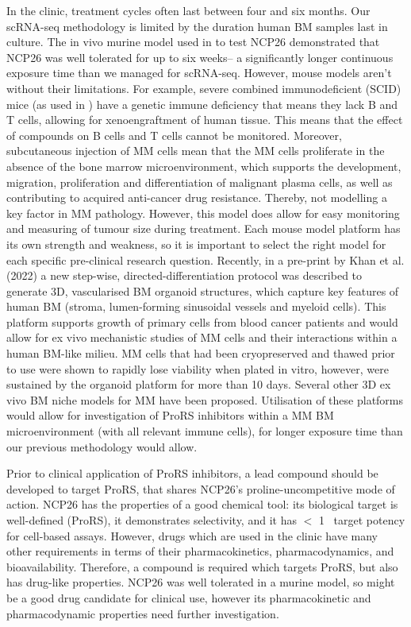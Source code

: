 In the clinic, treatment cycles often last between four and six months.
Our scRNA-seq methodology is limited by the duration human BM samples last in culture.
The in vivo murine model used in \cite{bottpreclinical2022} to test NCP26 demonstrated that NCP26 was well tolerated for up to six weeks-- a significantly longer continuous exposure time than we managed for scRNA-seq.
However, mouse models aren't without their limitations.
For example, severe combined immunodeficient (SCID) mice (as used in \cite{bottpreclinical2022}) have a genetic immune deficiency that means they lack B and T cells, allowing for xenoengraftment of human tissue.
This means that the effect of compounds on B cells and T cells cannot be monitored.
Moreover, subcutaneous injection of MM cells mean that the MM cells proliferate in the absence of the bone marrow microenvironment\cite{rossi2018mouse}, which supports the development, migration, proliferation and differentiation of malignant plasma cells, as well as contributing to acquired anti-cancer drug resistance.
Thereby, not modelling a key factor in MM pathology.
However, this model does allow for easy monitoring and measuring of tumour size during treatment.
Each mouse model platform has its own strength and weakness, so it is important to select the right model for each specific pre-clinical research question.
Recently, in a pre-print by Khan et al. (2022) a new step-wise, directed-differentiation protocol was described to generate 3D, vascularised BM organoid structures, which capture key features of human BM (stroma, lumen-forming sinusoidal vessels and myeloid cells)\cite{khan2022human}.
This platform supports growth of primary cells from blood cancer patients and would allow for ex vivo mechanistic studies of MM cells and their interactions within a human BM-like milieu\cite{khan2022human}.
MM cells that had been cryopreserved and thawed prior to use were shown to rapidly lose viability when plated in vitro, however, were sustained by the organoid platform for more than 10 days\cite{khan2022human}.
Several other 3D ex vivo BM niche models for MM have been proposed\cite{jakubikova2016novel,ferrarini20173d}.
Utilisation of these platforms would allow for investigation of ProRS inhibitors within a MM BM microenvironment (with all relevant immune cells), for longer exposure time than our previous methodology would allow.

Prior to clinical application of ProRS inhibitors, a lead compound should be developed to target ProRS, that shares NCP26's proline-uncompetitive mode of action.
NCP26 has the properties of a good chemical tool: its biological target is well-defined (ProRS), it demonstrates selectivity, and it has $<$ 1\si{\micro\Molar} target potency for cell-based assays.
However, drugs which are used in the clinic have many other requirements in terms of their pharmacokinetics, pharmacodynamics, and bioavailability.
Therefore, a compound is required which targets ProRS, but also has drug-like properties.
NCP26 was well tolerated in a murine model, so might be a good drug candidate for clinical use, however its pharmacokinetic and pharmacodynamic properties need further investigation.

